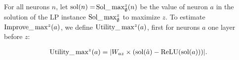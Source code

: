 \iffalse
\begin{align*}
	|(I_X - \sum_{b\in X} I_b)/I_X| < 1\%. \ (\text{in experiments})
\end{align*} Even $X$ contains neurons from 3 layers before the target layer, in experiments, $I_X$ is still close to $\sum_{b\in X} I_b$.

Therefore, based on this observation, the question to choose $X$ is converted to compute $I_b$ for neurons $b$ in layers before the target layer. Our formula is to estimate the improvement of different individual neurons in different layers. For different layers, the formula will be different.  However, neither the observation in this subsection nor the formula in the next subsection has solid theoretical proof to show that they are very accurate. They are all based on experiments. 


In our algorithm, we will open neurons at most 3 layer3 before the target layer. So the formula will consists of three parts.


\subsubsection*{Compute the improvement of a single neuron}

\subsection*{One Layer before $z$}

\fi

For all neurons $n$, let $\mathrm{sol}(n)=$$\mathrm{Sol}\_\max_\emptyset^z(n)$ be the value of neuron $a$
in the solution of the LP instance $\mathrm{Sol}\_\max_\emptyset^z$ to maximize $z$.
To estimate $\mathrm{Improve}\_\max^z(a)$, we define $\mathrm{Utility}\_\max^z(a)$, first for neurons $a$ one layer before $z$:

	\begin{align}
		\mathrm{Utility}\_\max\nolimits^z(a) = |W_{az} \times (\mathrm{sol}(\hat{a})- \mathrm{ReLU}(\mathrm{sol}(a)))|.
	\end{align}
	

